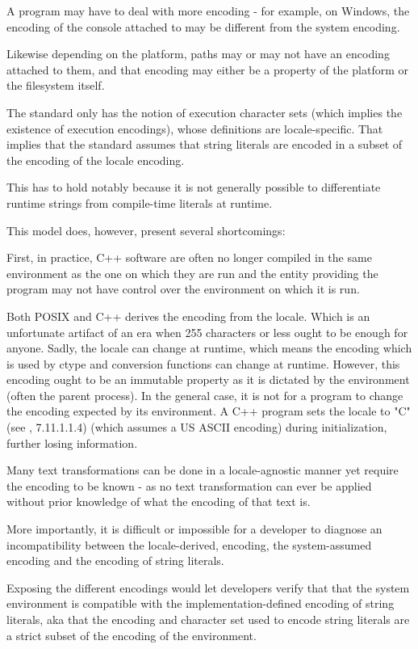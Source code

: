\documentclass{wg21}
\begin{document}
\note A program may have to deal with more encoding - for example, on Windows, the encoding of the console attached to  may be different from the system encoding. 

Likewise depending on the platform, paths may or may not have an encoding attached to them, and that encoding may either be a property of the platform or the filesystem itself. 
\endnote


The standard only has the notion of execution character sets (which implies the existence of execution encodings), whose definitions are locale-specific.
That implies that the standard assumes that string literals are encoded in a subset of the encoding of the locale encoding.

This has to hold notably because it is not generally possible to differentiate runtime strings from compile-time literals at runtime.  

This model does, however, present several shortcomings:

First, in practice, C++ software are often no longer compiled in the same environment as the one on which they are run and the entity providing the program may not have control over the environment on which it is run.

Both POSIX and C++ derives the encoding from the locale. Which is an unfortunate artifact of an era when 255 characters or less ought to be enough for anyone.
Sadly, the locale can change at runtime, which means the encoding which is used by ctype and conversion functions can change at runtime.
However, this encoding ought to be an immutable property as it is dictated by the environment (often the parent process).
In the general case, it is not for a program to change the encoding expected by its environment.
A C++ program sets the locale to "C" (see \cite{N2346}, 7.11.1.1.4) (which assumes a US ASCII encoding) during initialization, further losing information.


Many text transformations can be done in a locale-agnostic manner yet require the encoding to be known - as no text transformation can ever be applied without
prior knowledge of what the encoding of that text is.

More importantly, it is difficult or impossible for a developer to diagnose an incompatibility between the locale-derived, encoding, the system-assumed encoding and
the encoding of string literals.

Exposing the different encodings would let developers verify that that the system environment is compatible with the implementation-defined encoding of string literals, aka that the encoding and character set used to encode string literals are a strict subset of the encoding of the environment.
\end{document}
